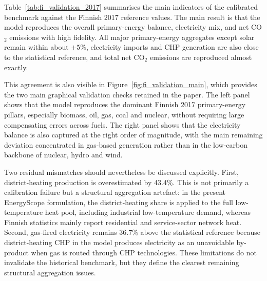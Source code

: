 \documentclass{article}
\begin{document}
Table~\ref{tab:fi_validation_2017} summarises the main indicators of the calibrated benchmark against the Finnish 2017 reference values. The main result is that the model reproduces the overall primary-energy balance, electricity mix, and net CO$_2$ emissions with high fidelity. All major primary-energy aggregates except solar remain within about $\pm 5\%$, electricity imports and CHP generation are also close to the statistical reference, and total net CO$_2$ emissions are reproduced almost exactly.

This agreement is also visible in Figure~\ref{fig:fi_validation_main}, which provides the two main graphical validation checks retained in the paper. The left panel shows that the model reproduces the dominant Finnish 2017 primary-energy pillars, especially biomass, oil, gas, coal and nuclear, without requiring large compensating errors across fuels. The right panel shows that the electricity balance is also captured at the right order of magnitude, with the main remaining deviation concentrated in gas-based generation rather than in the low-carbon backbone of nuclear, hydro and wind.

Two residual mismatches should nevertheless be discussed explicitly. First, district-heating production is overestimated by 43.4\%. This is not primarily a calibration failure but a structural aggregation artefact: in the present EnergyScope formulation, the district-heating share is applied to the full low-temperature heat pool, including industrial low-temperature demand, whereas Finnish statistics mainly report residential and service-sector network heat. Second, gas-fired electricity remains 36.7\% above the statistical reference because district-heating CHP in the model produces electricity as an unavoidable by-product when gas is routed through CHP technologies. These limitations do not invalidate the historical benchmark, but they define the clearest remaining structural aggregation issues.
\end{document}
